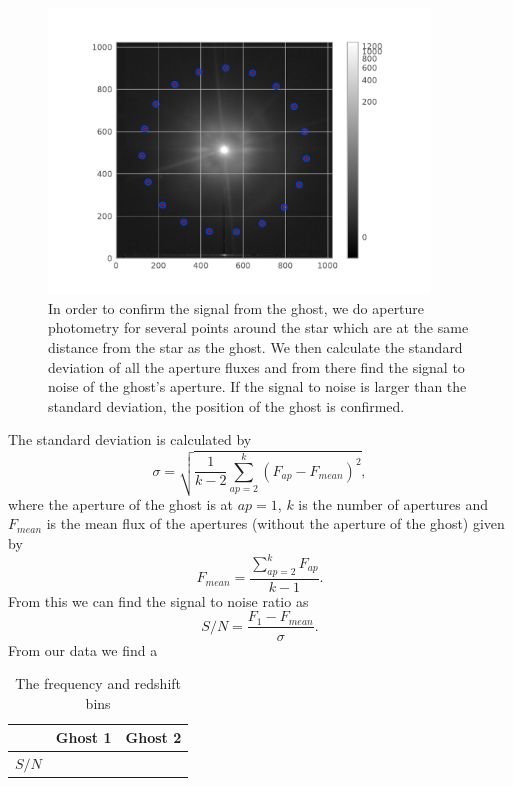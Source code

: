\begin{figure}[H]
	\centering
		\includegraphics[width=0.9\textwidth]{pics/aperture_photometry_19_ghost1.pdf}
		\caption{In order to confirm the signal from the ghost, we do aperture photometry for several points around the star which are at the same distance from the star as the ghost. We then calculate the standard deviation of all the aperture fluxes and from there find the signal to noise of the ghost's aperture. If the signal to noise is larger than the standard deviation, the position of the ghost is confirmed.}
		\label{fig:ap_phot_gh1}
\end{figure}
The standard deviation is calculated by
\begin{equation}
	\sigma = \sqrt{\frac{1}{k-2} \sum_{ap=2}^{k} (F_{ap} - F_{mean})^2} ,
\end{equation}
where the aperture of the ghost is at $ap=1$, $k$ is the number of apertures and $F_{mean}$ is the mean flux of the apertures (without the aperture of the ghost) given by
\begin{equation}
	F_{mean} = \frac{\sum_{ap=2}^{k} F_{ap}}{k-1} .
\end{equation}
From this we can find the signal to noise ratio as
\begin{equation}
	S/N = \frac{F_1 - F_{mean}}{\sigma} .
\end{equation}
From our data we find a 
\begin{table}[H] 
\label{table:freqtored}
\centering
\caption{The frequency and redshift bins}
\begin{tabular}{|c|c|c|}
\hline
 & Ghost 1 & Ghost 2\\
\hline
$S/N$ & & \\
\hline
\end{tabular}
\end{table}
